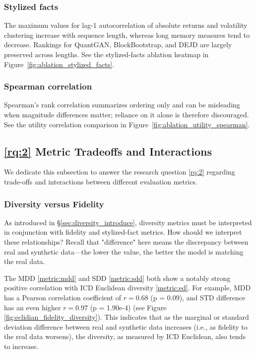 \documentclass[sigconf]{acmart}
\begin{document}
\subsubsection{Stylized facts}
  The maximum values for lag-1 autocorrelation of absolute returns and
  volatility clustering increase with sequence length, whereas long
  memory measures tend to decrease. Rankings for QuantGAN,
  BlockBootstrap, and DEJD are largely preserved across lengths. See
  the stylized-facts ablation heatmap in
  Figure~\ref{fig:ablation_stylized_facts}.

\subsubsection{Spearman correlation}
  Spearman's rank correlation summarizes ordering only and can be
  misleading when magnitude differences matter; reliance on it alone is
  therefore discouraged. See the utility correlation comparison in
  Figure~\ref{fig:ablation_utility_spearman}.


  \subsection{\ref{rq:2} Metric Tradeoffs and Interactions}
  \label{sec:metric_tradeoffs}
    We dedicate this subsection to answer the research question
    \ref{rq:2} regarding trade-offs and interactions between different
    evaluation metrics.

    \subsubsection{Diversity versus Fidelity}
      As introduced in §\ref{sec:diversity_introduce}, diversity
      metrics must be interpreted in conjunction with fidelity and
      stylized-fact metrics. How should we interpret these relationships? 
      Recall that "difference" here means the discrepancy between real 
      and synthetic data—the lower the value, the better the model is 
      matching the real data.

      The MDD \ref{metric:mdd} and SDD \ref{metric:sdd} 
      both show a notably strong positive correlation with ICD 
      Euclidean diversity \ref{metric:ed}. For example, MDD has a 
      Pearson correlation coefficient of \( r = 0.68 \) (p = 0.09), 
      and STD difference has an even higher \( r = 0.97 \) 
      (p = 1.90e-4) (see Figure \ref{fig:eclidian_fidelity_diversity}). 
      This indicates that as the marginal or standard deviation 
      difference between real and synthetic data increases (i.e., as 
      fidelity to the real data worsens), the diversity, as measured 
      by ICD Euclidean, also tends to increase.
\end{document}
